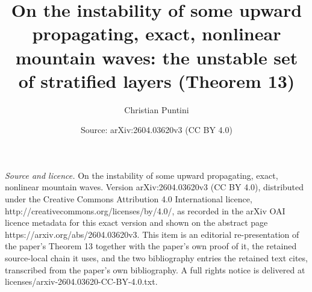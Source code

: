 \documentclass[10pt,a4paper]{amsart}
\title[On the instability of some upward propagating exact nonlinear mountain waves]{On the instability of some upward propagating, exact, nonlinear mountain waves: the unstable set of stratified layers (Theorem 13)}
\author[Christian Puntini]{Christian Puntini}
\date{Source: arXiv:2604.03620v3 (CC BY 4.0)}
\begin{document}
\maketitle
\vspace{1em}
\noindent\textit{Source and licence.} On the instability of some upward propagating, exact, nonlinear mountain waves. Version arXiv:2604.03620v3 (CC BY 4.0), distributed under the Creative Commons Attribution 4.0 International licence, http://creativecommons.org/licenses/by/4.0/, as recorded in the arXiv OAI licence metadata for this exact version and shown on the abstract page https://arxiv.org/abs/2604.03620v3. This item is an editorial re-presentation of the paper's Theorem 13 together with the paper's own proof of it, the retained source-local chain it uses, and the two bibliography entries the retained text cites, transcribed from the paper's own bibliography. A full rights notice is delivered at licenses/arxiv-2604.03620-CC-BY-4.0.txt.
\end{document}
